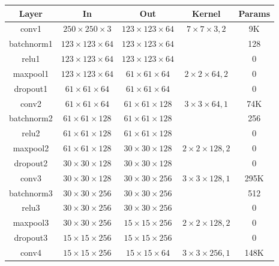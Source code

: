 \documentclass{article}
\newcommand{\B}[1]{\textbf{#1}}
\begin{document}
\begin{sloppypar}
        \begin{center}
            \begin{table}[!h]
                \begin{tabular}{|c|c|c|c|c|}
                    \hline
                    \B{Layer} & \B{In} & \B{Out} & \B{Kernel} & \B{Params}\\
                    \hline \hline
                    conv1 & $250\times 250\times 3$ & $123\times 123\times 64$ & $7\times 7\times 3, 2$ & 9K\\
                    batchnorm1 & $123\times 123\times 64$ & $123\times 123\times 64$ & & 128\\
                    relu1 & $123\times 123\times 64$ & $123\times 123\times 64$ & & 0\\
                    maxpool1 & $123\times 123\times 64$ & $61\times 61\times 64$ & $2\times 2\times 64, 2$ & 0\\
                    dropout1 & $61\times 61\times 64$ & $61\times 61\times 64$ & & 0\\
                    \hline
                    conv2 & $61\times 61\times 64$ & $61\times 61\times 128$ & $3\times 3\times 64, 1$ & 74K\\
                    batchnorm2 & $61\times 61\times 128$ & $61\times 61\times 128$ & & 256\\
                    relu2 & $61\times 61\times 128$ & $61\times 61\times 128$ & & 0\\
                    maxpool2 & $61\times 61\times 128$ & $30\times 30\times 128$ & $2\times 2\times 128, 2$ & 0\\
                    dropout2 & $30\times 30\times 128$ & $30\times 30\times 128$ & & 0\\
                    \hline
                    conv3 & $30\times 30\times 128$ & $30\times 30\times 256$ & $3\times 3\times 128, 1$ & 295K\\
                    batchnorm3 & $30\times 30\times 256$ & $30\times 30\times 256$ & & 512\\
                    relu3 & $30\times 30\times 256$ & $30\times 30\times 256$ & & 0\\
                    maxpool3 & $30\times 30\times 256$ & $15\times 15\times 256$ & $2\times 2\times 128, 2$ & 0\\
                    dropout3 & $15\times 15\times 256$ & $15\times 15\times 256$ & & 0\\
                    \hline
                    conv4 & $15\times 15\times 256$ & $15\times 15\times 64$ & $3\times 3\times 256, 1$ & 148K\\

\end{tabular}
\end{table}
\end{center}
\end{sloppypar}
\end{document}
